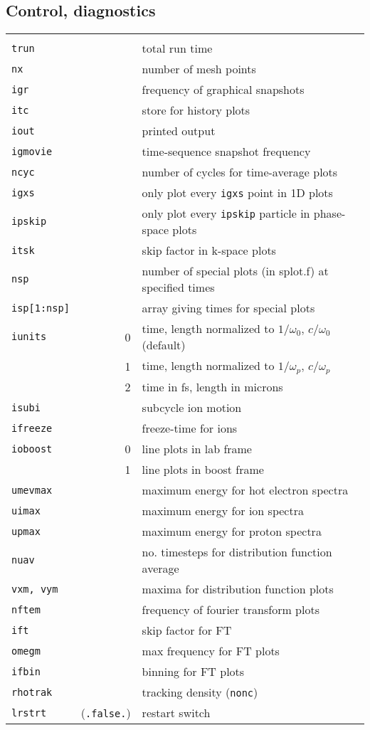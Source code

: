 \documentclass[11pt]{article}
\begin{document}
\subsection{Control, diagnostics}
\begin{tabular}{lrl} 
\hline\\
\texttt{trun} & & total run time \\ 
\texttt{nx}& & number of mesh points\\ 
\texttt{igr} & & frequency of graphical snapshots\\ 
\texttt{itc} & & store for history plots\\ 
\texttt{iout} & & printed output\\ 
\texttt{igmovie} & & time-sequence snapshot frequency\\ 
\texttt{ncyc} & & number of cycles for time-average plots \\
\texttt{igxs} & & only plot every \texttt{igxs} point in 1D plots \\
\texttt{ipskip} & & only plot every \texttt{ipskip} particle in phase-space plots \\ 
\texttt{itsk} & & skip factor in k-space plots \\
\texttt{nsp} & & number of special plots (in splot.f) at specified times \\
\texttt{isp[1:nsp]} & & array giving times for special plots \\
\texttt{iunits} & 0 & time, length normalized to $1/\omega_0$, $c/\omega_0$ (default)\\
 & 1 & time, length normalized to $1/\omega_p$, $c/\omega_p$ \\
 & 2 & time in fs, length in microns \\
\texttt{isubi} & & subcycle ion motion  \\
\texttt{ifreeze} & & freeze-time for ions \\
\texttt{ioboost} & 0 & line plots in lab frame  \\
 & 1 & line plots in boost frame  \\
\texttt{umevmax} & & maximum energy for hot electron spectra  \\
\texttt{uimax} & & maximum energy for ion spectra  \\
\texttt{upmax} & & maximum energy for proton spectra  \\
\texttt{nuav} & & no. timesteps for distribution function average\\
\texttt{vxm, vym} & & maxima for distribution function plots  \\
\texttt{nftem} & & frequency of fourier transform plots\\
\texttt{ift} & & skip factor for FT\\
\texttt{omegm} & & max frequency for FT plots\\
\texttt{ifbin} & & binning for FT plots\\
\texttt{rhotrak} & & tracking density (\texttt{nonc}) \\
\texttt{lrstrt} & (\texttt{.false.}) & restart switch \\
\end{tabular}
\end{document}
